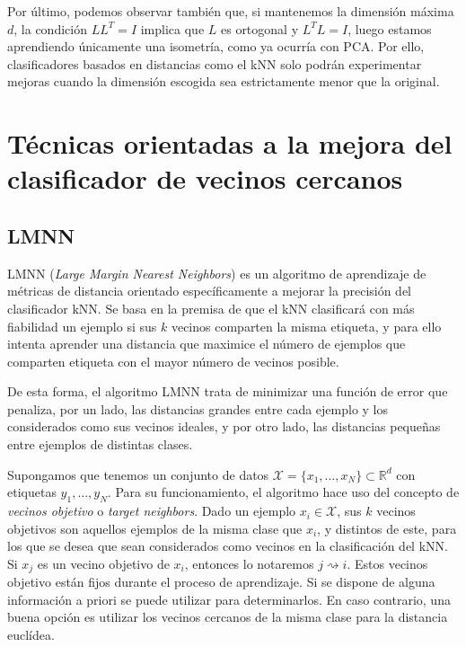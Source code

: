 \documentclass{book}
\newcommand{\istargetof}{\rightsquigarrow}
\begin{document}
Por último, podemos observar también que, si mantenemos la dimensión máxima $d$, la condición $LL^T = I$ implica que $L$ es ortogonal y $L^TL=I$, luego estamos aprendiendo únicamente una isometría, como ya ocurría con PCA. Por ello, clasificadores basados en distancias como el kNN solo podrán experimentar mejoras cuando la dimensión escogida sea estrictamente menor que la original.


\section{Técnicas orientadas a la mejora del clasificador de vecinos cercanos}

\subsection{LMNN} \label{section:lmnn}

LMNN (\textit{Large Margin Nearest Neighbors}) \cite{lmnn} es un algoritmo de aprendizaje de métricas de distancia orientado específicamente a mejorar la precisión del clasificador kNN. Se basa en la premisa de que el kNN clasificará con más fiabilidad un ejemplo si sus $k$ vecinos comparten la misma etiqueta, y para ello intenta aprender una distancia que maximice el número de ejemplos que comparten etiqueta con el mayor número de vecinos posible.

De esta forma, el algoritmo LMNN trata de minimizar una función de error que penaliza, por un lado, las distancias grandes entre cada ejemplo y los considerados como sus vecinos ideales, y por otro lado, las distancias pequeñas entre ejemplos de distintas clases.

Supongamos que tenemos un conjunto de datos $\mathcal{X} = \{x_1,\dots,x_N\} \subset \mathbb{R}^d$ con etiquetas $y_1,\dots,y_N$. Para su funcionamiento, el algoritmo hace uso del concepto de \emph{vecinos objetivo} o \emph{target neighbors}. Dado un ejemplo $x_i \in \mathcal{X}$, sus $k$ vecinos objetivos son aquellos ejemplos de la misma clase que $x_i$, y distintos de este, para los que se desea que sean considerados como vecinos en la clasificación del kNN. Si $x_j$ es un vecino objetivo de $x_i$, entonces lo notaremos $j \istargetof i$. Estos vecinos objetivo están fijos durante el proceso de aprendizaje. Si se dispone de alguna información a priori se puede utilizar para determinarlos. En caso contrario, una buena opción es utilizar los vecinos cercanos de la misma clase para la distancia euclídea.
\end{document}
